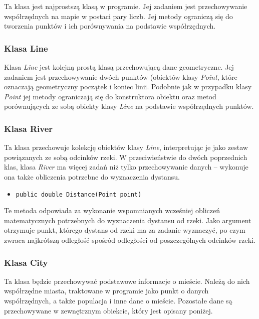 \documentclass[a4paper,12pt]{article}
\newcommand\tab[1][0.6cm]{\hspace*{#1} }
\begin{document}
\tab Ta klasa jest najprostszą klasą w programie. Jej zadaniem jest przechowywanie współrzędnych na mapie w postaci pary liczb. Jej metody ograniczą się do tworzenia punktów i ich porównywania na podstawie współrzędnych.

\subsubsection{Klasa Line}

\tab Klasa \textit{Line} jest kolejną prostą klasą przechowującą dane geometryczne. Jej zadaniem jest przechowywanie dwóch punktów (obiektów klasy \textit{Point}, które oznaczają geometryczny początek i koniec linii. Podobnie jak w przypadku klasy \textit{Point} jej metody ograniczają się do konstruktora obiektu oraz metod porównujących ze sobą obiekty klasy \textit{Line} na podstawie współrzędnych punktów.

\subsubsection{Klasa River}


\tab Ta klasa przechowuje kolekcję obiektów klasy \textit{Line}, interpretując je jako zestaw powiązanych ze sobą odcinków rzeki. W przeciwieństwie do dwóch poprzednich klas, klasa \textit{River} ma więcej zadań niż tylko przechowywanie danych -- wykonuje ona także obliczenia potrzebne do wyznaczenia dystansu.

\begin{itemize}
\item \begin{lstlisting}
public double Distance(Point point)
\end{lstlisting}
\end{itemize}

Te metoda odpowiada za wykonanie wspomnianych wcześniej obliczeń matematycznych potrzebnych do wyznaczenia dystansu od rzeki. Jako argument otrzymuje punkt, którego dystans od rzeki ma za zadanie wyznaczyć, po czym zwraca najkrótszą odległość spośród odległości od poszczególnych odcinków rzeki.

\subsubsection{Klasa City}


\tab Ta klasa będzie przechowywać podstawowe informacje o mieście. Należą do nich współrzędne miasta, traktowane w programie jako punkt o danych współrzędnych, a także populacja i inne dane o mieście. Pozostałe dane są przechowywane w zewnętrznym obiekcie, który jest opisany poniżej. 
\end{document}
